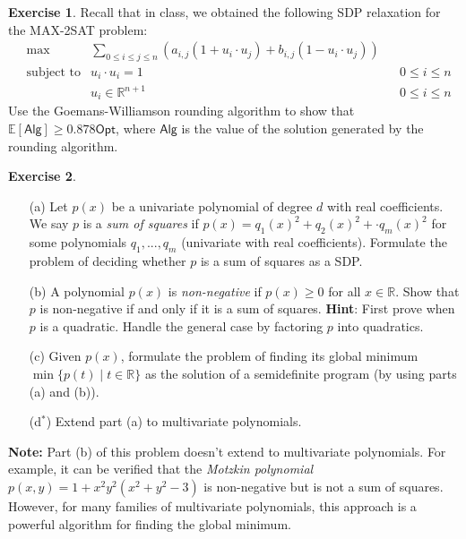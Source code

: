 \documentclass[11pt]{article}
\theoremstyle{definition}
\newtheorem{exercise}{Exercise}
\newcommand{\R}{\mathbb{R}}
\begin{document}
\vspace{.5cm}

\begin{exercise}
Recall that in class, we obtained the following SDP relaxation for the \textsf{MAX-2SAT} problem:
\begin{align*}
&\max &\sum_{0 \leq i \leq j \leq n} (a_{i,j} (1+u_i \cdot u_j) +b_{i,j} (1-u_i \cdot u_j))\\
&\text{subject to} & u_i \cdot u_i =1 && 0 \leq i \leq n\\
& & u_i \in \R^{n+1} && 0 \leq i \leq n
\end{align*}
Use the Goemans-Williamson rounding algorithm to show that $\mathbb{E}[\mathsf{Alg}] \geq 0.878 \mathsf{Opt}$, where $\mathsf{Alg}$ is the value of the solution generated by the rounding algorithm.
\end{exercise}

\vspace{.5cm}
\begin{exercise}
\begin{enumerate}
\item[(a)]
Let $p(x)$ be a univariate polynomial of degree $d$ with real coefficients. We say $p$ is a {\em sum of squares} if $p(x) = q_1(x)^2 + q_2(x)^2 + \cdot q_m(x)^2$ for some polynomials $q_1, ..., q_m$ (univariate with real coefficients). Formulate the problem of deciding whether $p$ is a sum of squares as a SDP.
\item[(b)]
A polynomial $p(x)$ is {\em non-negative} if $p(x) \geq 0$ for all $x \in \R$. Show that $p$ is non-negative if and only if it is a sum of squares. \textbf{Hint}: First prove when $p$ is a quadratic. Handle the general case by factoring $p$ into quadratics.
\item[(c)]
Given $p(x)$, formulate the problem of finding its global minimum $\min\{p(t) \mid t \in \R\}$ as the solution of a semidefinite program (by using parts (a) and (b)).
\item[(d$^\ast$)] Extend part (a) to multivariate polynomials.
\end{enumerate}
\vspace{.3cm}
\textbf{Note:} Part (b) of this problem doesn't extend to multivariate polynomials. For example, it can be verified that the {\em Motzkin polynomial} $p(x,y) = 1+x^2y^2 (x^2 + y^2 - 3)$ is non-negative but is not a sum of squares. However, for many families of multivariate polynomials, this approach is a powerful algorithm for finding the global minimum.
\end{exercise}
\end{document}

